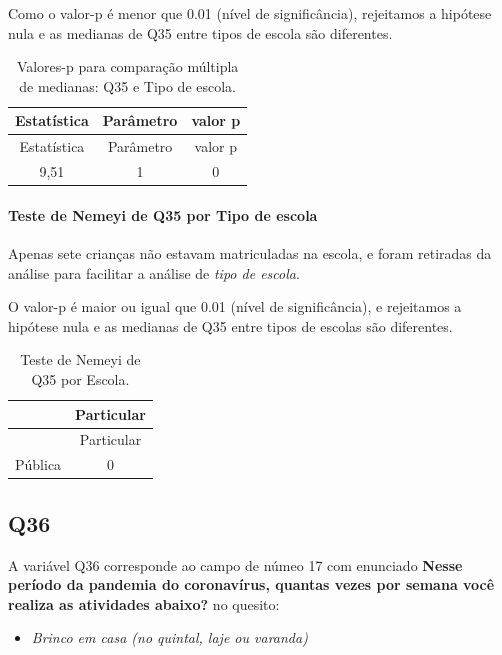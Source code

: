 \documentclass[]{article}
\providecommand{\tightlist}{%
  \setlength{\itemsep}{0pt}\setlength{\parskip}{0pt}}
\let\oldparagraph\paragraph
\renewcommand{\paragraph}[1]{\oldparagraph{#1}\mbox{}}
\begin{document}
Como o valor-p é menor que 0.01 (nível de significância), rejeitamos a hipótese nula e as medianas de Q35 entre tipos de escola são diferentes.

\begin{longtable}[]{@{}ccc@{}}
\caption{\label{tab:unnamed-chunk-1299}Valores-p para comparação múltipla de medianas: Q35 e Tipo de escola.}\tabularnewline
\toprule
Estatística & Parâmetro & valor p\tabularnewline
\midrule
\endfirsthead
\toprule
Estatística & Parâmetro & valor p\tabularnewline
\midrule
\endhead
9,51 & 1 & 0\tabularnewline
\bottomrule
\end{longtable}

\hypertarget{teste-de-nemeyi-de-q35-por-tipo-de-escola}{%
\paragraph{Teste de Nemeyi de Q35 por Tipo de escola}\label{teste-de-nemeyi-de-q35-por-tipo-de-escola}}

Apenas sete crianças não estavam matriculadas na escola, e foram retiradas da análise para facilitar a análise de \emph{tipo de escola}.

O valor-p é maior ou igual que 0.01 (nível de significância), e rejeitamos a hipótese nula e as medianas de Q35 entre tipos de escolas são diferentes.

\begin{longtable}[]{@{}lc@{}}
\caption{\label{tab:unnamed-chunk-1301}Teste de Nemeyi de Q35 por Escola.}\tabularnewline
\toprule
& Particular\tabularnewline
\midrule
\endfirsthead
\toprule
& Particular\tabularnewline
\midrule
\endhead
Pública & 0\tabularnewline
\bottomrule
\end{longtable}

\cleardoublepage

\hypertarget{q36}{%
\subsection{Q36}\label{q36}}

A variável Q36 corresponde ao campo de númeo 17 com enunciado \textbf{Nesse período da pandemia do coronavírus, quantas vezes por semana você realiza as atividades abaixo?} no quesito:

\begin{itemize}
\tightlist
\item
  \emph{Brinco em casa (no quintal, laje ou varanda)}
\end{itemize}
\end{document}
